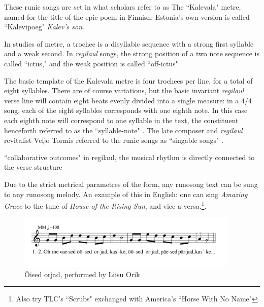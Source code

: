 These runic songs are set in what scholars refer to as The ``Kalevala" metre, named for the title of the epic poem in Finnish; Estonia's own version is called ``Kalevipoeg" {\it Kalev's son}. 

%

In studies of metre, a trochee is a disyllabic sequence with a strong first syllable and a weak second. In {\it regilaul} songs, the strong position of a two note sequence is called ``ictus," and the weak position is called ``off-ictus"

 The basic template of the Kalevala metre is four trochees per line, for a total of eight syllables. There are of course variations, but the basic invariant {\it regilaul} verse line will contain eight beats evenly divided into a single measure: in a 4/4 song, each of the eight syllables corresponds with one eighth note. In this case each eighth note will correspond to one syllable in the text, the constituent henceforth referred to as the ``syllable-note" \citep{ruutelResultsComputerizedComparative1999}. The late composer and {\it regilaul} revitalist Veljo Tormis referred to the runic songs as ``singable songs" \citep{tormisProblemsThatRegilaul2007}. 
 
 ``collaborative outcomes" 
 in regilaul, the musical rhythm is directly connected to the verse structure \citep{orasMusicalManifestationsTextual2010}
 
 Due to the strict metrical parametres of the form, any runosong text can be sung to any runosong melody. An example of this in English: one can sing {\it Amazing Grace} to the tune of {\it House of the Rising Sun}, and vice a versa.\footnote{Also try TLC's ``Scrubs" exchanged with America's ``Horse With No Name"}. 
\begin{figure}[htb]
\begin{center}
\includegraphics[width=300pt]{figures/069.png}
\caption{Öised orjad, performed by Liisu Orik}
\label{song69}
\end{center}
\end{figure}

